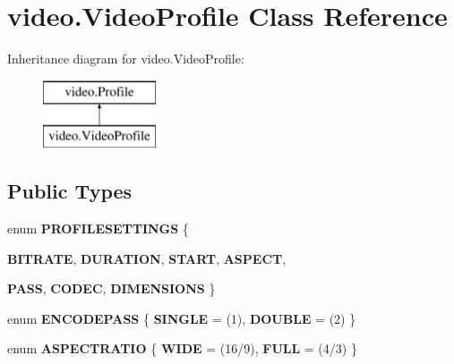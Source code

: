 \hypertarget{classvideo_1_1_video_profile}{
\section{video.VideoProfile Class Reference}
\label{classvideo_1_1_video_profile}
}
Inheritance diagram for video.VideoProfile:\begin{figure}[H]
\begin{center}
\leavevmode
\includegraphics[height=2.000000cm]{classvideo_1_1_video_profile}
\end{center}
\end{figure}
\subsection*{Public Types}
\begin{DoxyCompactItemize}
\item 
enum {\bfseries PROFILESETTINGS} \{ \par
{\bfseries BITRATE}, 
{\bfseries DURATION}, 
{\bfseries START}, 
{\bfseries ASPECT}, 
\par
{\bfseries PASS}, 
{\bfseries CODEC}, 
{\bfseries DIMENSIONS}
 \}
\item 
enum {\bfseries ENCODEPASS} \{ {\bfseries SINGLE} = (1), 
{\bfseries DOUBLE} = (2)
 \}
\item 
enum {\bfseries ASPECTRATIO} \{ {\bfseries WIDE} = (16/9), 
{\bfseries FULL} = (4/3)
 \}
\end{DoxyCompactItemize}
